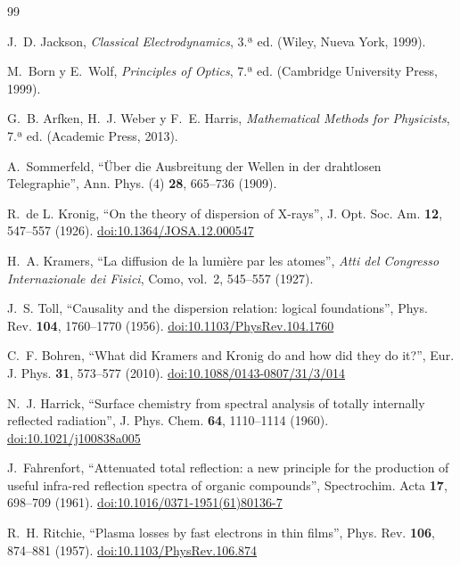 \documentclass[11pt,letterpaper]{article}
\begin{document}
\renewcommand{\refname}{\color{azul}Bibliografía}
\begin{thebibliography}{99}
\footnotesize
\setlength{\itemsep}{0pt}

 J.~D. Jackson, \emph{Classical Electrodynamics}, 3.ª ed.
(Wiley, Nueva York, 1999).

 M.~Born y E.~Wolf, \emph{Principles of Optics}, 7.ª ed.
(Cambridge University Press, 1999).

 G.~B. Arfken, H.~J. Weber y F.~E. Harris, \emph{Mathematical
Methods for Physicists}, 7.ª ed. (Academic Press, 2013).

 A.~Sommerfeld, ``Über die Ausbreitung der Wellen in der
drahtlosen Telegraphie'', Ann. Phys. (4) \textbf{28}, 665--736 (1909).

 R.~de L. Kronig, ``On the theory of dispersion of X-rays'',
J. Opt. Soc. Am. \textbf{12}, 547--557 (1926).
\href{https://doi.org/10.1364/JOSA.12.000547}{doi:10.1364/JOSA.12.000547}

 H.~A. Kramers, ``La diffusion de la lumière par les
atomes'', \emph{Atti del Congresso Internazionale dei Fisici}, Como, vol.~2,
545--557 (1927).

 J.~S. Toll, ``Causality and the dispersion relation: logical
foundations'', Phys. Rev. \textbf{104}, 1760--1770 (1956).
\href{https://doi.org/10.1103/PhysRev.104.1760}{doi:10.1103/PhysRev.104.1760}

 C.~F. Bohren, ``What did Kramers and Kronig do and how did
they do it?'', Eur. J. Phys. \textbf{31}, 573--577 (2010).
\href{https://doi.org/10.1088/0143-0807/31/3/014}{doi:10.1088/0143-0807/31/3/014}

 N.~J. Harrick, ``Surface chemistry from spectral analysis of
totally internally reflected radiation'', J. Phys. Chem. \textbf{64},
1110--1114 (1960).
\href{https://doi.org/10.1021/j100838a005}{doi:10.1021/j100838a005}

 J.~Fahrenfort, ``Attenuated total reflection: a new
principle for the production of useful infra-red reflection spectra of organic
compounds'', Spectrochim. Acta \textbf{17}, 698--709 (1961).
\href{https://doi.org/10.1016/0371-1951(61)80136-7}{doi:10.1016/0371-1951(61)80136-7}

 R.~H. Ritchie, ``Plasma losses by fast electrons in thin
films'', Phys. Rev. \textbf{106}, 874--881 (1957).
\href{https://doi.org/10.1103/PhysRev.106.874}{doi:10.1103/PhysRev.106.874}


\end{thebibliography}
\end{document}
